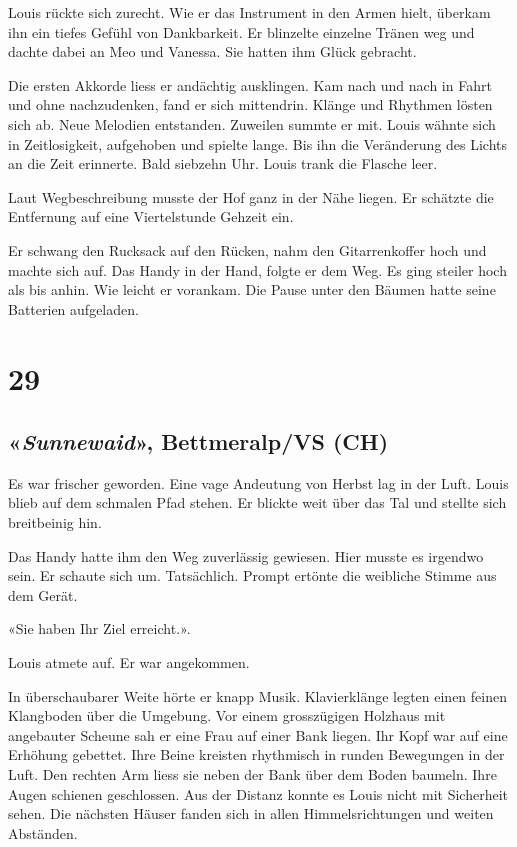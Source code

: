 Louis rückte sich zurecht. Wie er das Instrument in den Armen hielt,
überkam ihn ein tiefes Gefühl von Dankbarkeit. Er blinzelte einzelne
Tränen weg und dachte dabei an Meo und Vanessa. Sie hatten ihm Glück
gebracht.

Die ersten Akkorde liess er andächtig ausklingen. Kam nach und nach in
Fahrt und ohne nachzudenken, fand er sich mittendrin. Klänge und
Rhythmen lösten sich ab. Neue Melodien entstanden. Zuweilen summte er
mit. Louis wähnte sich in Zeitlosigkeit, aufgehoben und spielte lange.
Bis ihn die Veränderung des Lichts an die Zeit erinnerte. Bald siebzehn
Uhr. Louis trank die Flasche leer.

Laut Wegbeschreibung musste der Hof ganz in der Nähe liegen. Er schätzte
die Entfernung auf eine Viertelstunde Gehzeit ein.

Er schwang den Rucksack auf den Rücken, nahm den Gitarrenkoffer hoch und
machte sich auf. Das Handy in der Hand, folgte er dem Weg. Es ging
steiler hoch als bis anhin. Wie leicht er vorankam. Die Pause unter den
Bäumen hatte seine Batterien aufgeladen.

\chapter{29}\label{section-28}

\section{\texorpdfstring{«\emph{Sunnewaid}», Bettmeralp/VS
(CH)}{«Sunnewaid», Bettmeralp/VS (CH)}}\label{sunnewaid-bettmeralpvs-ch}

Es war frischer geworden. Eine vage Andeutung von Herbst lag in der
Luft. Louis blieb auf dem schmalen Pfad stehen. Er blickte weit über das
Tal und stellte sich breitbeinig hin.

Das Handy hatte ihm den Weg zuverlässig gewiesen. Hier musste es
irgendwo sein. Er schaute sich um. Tatsächlich. Prompt ertönte die
weibliche Stimme aus dem Gerät.

«Sie haben Ihr Ziel erreicht.».

Louis atmete auf. Er war angekommen.

In überschaubarer Weite hörte er knapp Musik. Klavierklänge legten einen
feinen Klangboden über die Umgebung. Vor einem grosszügigen Holzhaus mit
angebauter Scheune sah er eine Frau auf einer Bank liegen. Ihr Kopf war
auf eine Erhöhung gebettet. Ihre Beine kreisten rhythmisch in runden
Bewegungen in der Luft. Den rechten Arm liess sie neben der Bank über
dem Boden baumeln. Ihre Augen schienen geschlossen. Aus der Distanz
konnte es Louis nicht mit Sicherheit sehen. Die nächsten Häuser fanden
sich in allen Himmelsrichtungen und weiten Abständen.

